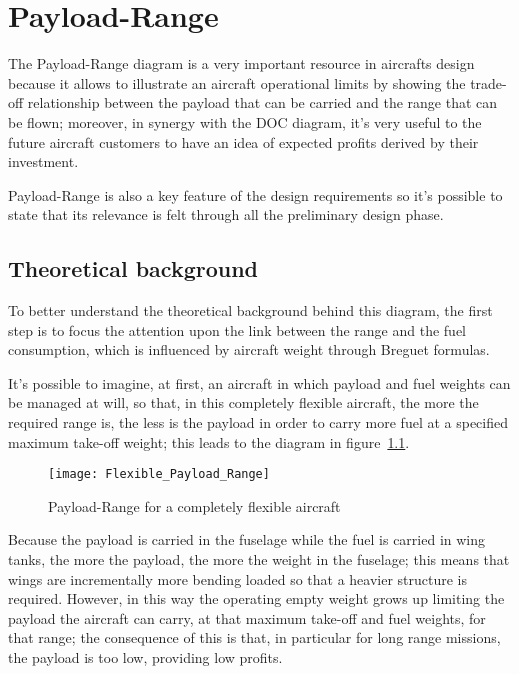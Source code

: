 \chapter{Payload-Range}
The Payload-Range diagram is a very important resource in aircrafts design because it allows to illustrate an aircraft operational limits by showing the trade-off relationship between the payload that can be carried and the range that can be flown; moreover, in synergy with the \gls{DOC} diagram, it’s very useful to the future aircraft customers to have an idea of expected profits derived by their investment.

Payload-Range is also a key feature of the design requirements so it’s possible to state that its relevance is felt through all the preliminary design phase.

\section{Theoretical background}
To better understand the theoretical background behind this diagram, the first step is to focus the attention upon the link between the range and the fuel consumption, which is influenced by aircraft weight through Breguet formulas. 

It’s possible to imagine, at first, an aircraft in which payload and fuel weights can be managed at will, so that, in this completely flexible aircraft, the more the required range is, the less is the payload in order to carry more fuel at a specified maximum take-off weight; this leads to the diagram in figure~\ref{fig:Figure1}.

\begin{figure}[ht]
\centering
\texttt{[image: Flexible\_Payload\_Range]}
\caption{Payload-Range for a completely flexible aircraft}
\label{fig:Figure1}
\end{figure}

Because the payload is carried in the fuselage while the fuel is carried in wing tanks, the more the payload, the more the weight in the fuselage; this means that wings are incrementally more bending loaded so that a heavier structure is required. However, in this way the operating empty weight grows up limiting the payload the aircraft can carry, at that maximum take-off and fuel weights, for that range; the consequence of this is that, in particular for long range missions, the payload is too low, providing low profits.

